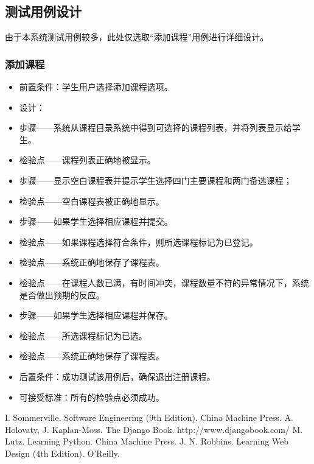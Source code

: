 \subsection{测试用例设计}

由于本系统测试用例较多，此处仅选取“添加课程”用例进行详细设计。

\subsubsection{添加课程}
  \begin{itemize}
    \item 前置条件：学生用户选择添加课程选项。
    \item 设计：
    \item 步骤——系统从课程目录系统中得到可选择的课程列表，并将列表显示给学生。
    \item 检验点——课程列表正确地被显示。
    \item 步骤——显示空白课程表并提示学生选择四门主要课程和两门备选课程；
    \item 检验点——空白课程表被正确地显示。
    \item 步骤——如果学生选择相应课程并提交。
    \item 检验点——如果课程选择符合条件，则所选课程标记为已登记。
    \item 检验点——系统正确地保存了课程表。
    \item 检验点——在课程人数已满，有时间冲突，课程数量不符的异常情况下，系统是否做出预期的反应。
    \item 步骤——如果学生选择相应课程并保存。
    \item 检验点——所选课程标记为已选。
    \item 检验点——系统正确地保存了课程表。
    \item 后置条件：成功测试该用例后，确保退出注册课程。
    \item 可接受标准：所有的检验点必须成功。
  \end{itemize}
  
\begin{thebibliography}{}
  \bibitem{} I. Sommerville. Software Engineering (9th Edition). China Machine Press. 
  \bibitem{} A. Holovaty, J. Kaplan-Moss. The Django Book. http://www.djangobook.com/
  \bibitem{} M. Lutz. Learning Python. China Machine Press. 
  \bibitem{} J. N. Robbins. Learning Web Design (4th Edition). O'Reilly. 
\end{thebibliography}
